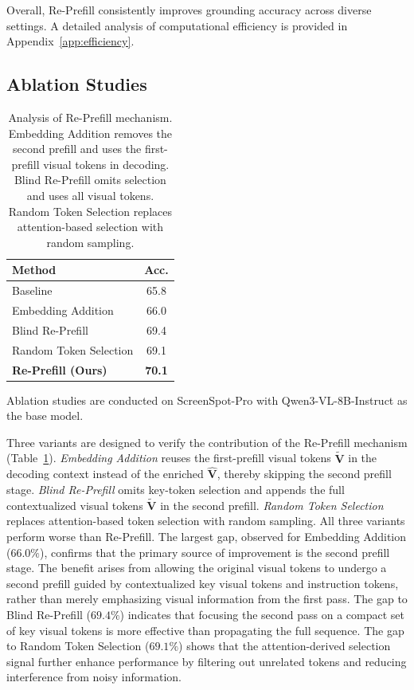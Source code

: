 \documentclass{article}
\begin{document}
Overall, Re-Prefill consistently improves grounding accuracy across diverse settings.
A detailed analysis of computational efficiency is provided in Appendix~\ref{app:efficiency}.


\subsection{Ablation Studies}
\label{sec:ablation}

\begin{table}
    \vspace{-3.5em}
    \centering
    \caption{Analysis of Re-Prefill mechanism. Embedding Addition removes the second prefill and uses the first-prefill visual tokens in decoding. Blind Re-Prefill omits selection and uses all visual tokens. Random Token Selection replaces attention-based selection with random sampling.}
    \footnotesize
    \begin{tabular}{lc}
    \toprule
    \textbf{Method} & \textbf{Acc.} \\
    \midrule
    Baseline & 65.8 \\
    \midrule
    Embedding Addition       & 66.0 \\
    Blind Re-Prefill         & 69.4 \\
    Random Token Selection   & 69.1 \\
    \textbf{Re-Prefill (Ours)} & \textbf{70.1} \\
    \bottomrule
    \end{tabular}
    \label{tab:ablation_component}
    \vspace{-2.0em}
\end{table}

Ablation studies are conducted on ScreenSpot-Pro with Qwen3-VL-8B-Instruct as the base model.

Three variants are designed to verify the contribution of the Re-Prefill mechanism (Table~\ref{tab:ablation_component}).
\emph{Embedding Addition} reuses the first-prefill visual tokens $\tilde{\mathbf{V}}$ in the decoding context instead of the enriched $\hat{\mathbf{V}}$, thereby skipping the second prefill stage.
\emph{Blind Re-Prefill} omits key-token selection and appends the full contextualized visual tokens $\tilde{\mathbf{V}}$ in the second prefill.
\emph{Random Token Selection} replaces attention-based token selection with random sampling.
All three variants perform worse than Re-Prefill.
The largest gap, observed for Embedding Addition ($66.0\%$), confirms that the primary source of improvement is the second prefill stage. The benefit arises from allowing the original visual tokens to undergo a second prefill guided by contextualized key visual tokens and instruction tokens, rather than merely emphasizing visual information from the first pass.
The gap to Blind Re-Prefill ($69.4\%$) indicates that focusing the second pass on a compact set of key visual tokens is more effective than propagating the full sequence.
The gap to Random Token Selection ($69.1\%$) shows that the attention-derived selection signal further enhance performance by filtering out unrelated tokens and reducing interference from noisy information.
\end{document}
